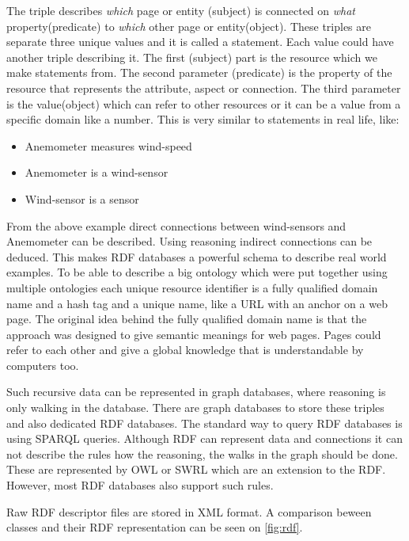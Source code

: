 The triple describes \textit{which} page or entity (subject) is connected on \textit{what} property(predicate) to \textit{which} other page or entity(object). These triples are separate three unique values and it is called a statement.
Each value could have another triple describing it. The first (subject) part is the resource  which we make statements from. The second parameter (predicate) is the property of the resource that represents the attribute, aspect or connection. The third parameter is the value(object) which can refer to other resources or it can be a value from a specific domain like a number. This is very similar to statements in real life, like:
\begin{itemize}
\item Anemometer measures wind-speed
\item Anemometer is a wind-sensor
\item Wind-sensor is a sensor
\end{itemize} 
From the above example direct connections between wind-sensors and Anemometer can be described. Using reasoning indirect connections can be deduced. This makes RDF databases a powerful schema to describe real world examples. To be able to describe a big ontology which were put together using multiple ontologies each unique resource identifier is a fully qualified domain name and a hash tag and a unique name, like a URL with an anchor on a web page. 
The original idea behind the fully qualified domain name is that the approach was designed to give semantic meanings for web pages. 
Pages could refer to each other and give a global knowledge that is understandable by computers too. 

Such recursive data can be represented in graph databases, where reasoning is only walking in the database. There are graph databases to store these triples and also dedicated RDF databases. The standard way to query RDF databases is using SPARQL queries. Although RDF can represent data and connections it can not describe the rules how the reasoning, the walks in the graph should be done. These are represented by OWL or SWRL which are an extension to the RDF. However, most RDF databases also support such rules.

Raw RDF descriptor files are stored in XML format. A comparison beween classes and their RDF representation can be seen on \ref{fig:rdf}.


